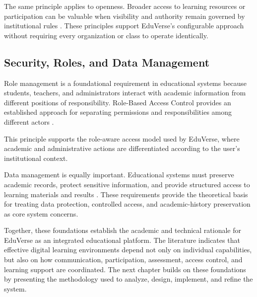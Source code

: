 The same principle applies to openness. Broader access to learning resources or
participation can be valuable when visibility and authority remain governed by
institutional rules \cite{oecd2023outlook}. These principles support EduVerse's
configurable approach without requiring every organization or class to operate
identically.

\subsection{Security, Roles, and Data Management}
\label{subsec:security_roles_and_data_management}

Role management is a foundational requirement in educational systems because
students, teachers, and administrators interact with academic information from
different positions of responsibility. Role-Based Access Control provides an
established approach for separating permissions and responsibilities among
different actors \cite{kabier2023rbac}.

This principle supports the role-aware access model used by EduVerse, where
academic and administrative actions are differentiated according to the user's
institutional context.

Data management is equally important. Educational systems must preserve
academic records, protect sensitive information, and provide structured access
to learning materials and results \cite{liu2023privacy,kabier2023rbac}. These
requirements provide the theoretical basis for treating data protection,
controlled access, and academic-history preservation as core system concerns.

\enlargethispage{3\baselineskip}
Together, these foundations establish the academic and technical rationale for
EduVerse as an integrated educational platform. The literature indicates that
effective digital learning environments depend not only on individual
capabilities, but also on how communication, participation, assessment, access
control, and learning support are coordinated. The next chapter builds on these
foundations by presenting the methodology used to analyze, design, implement,
and refine the system.
